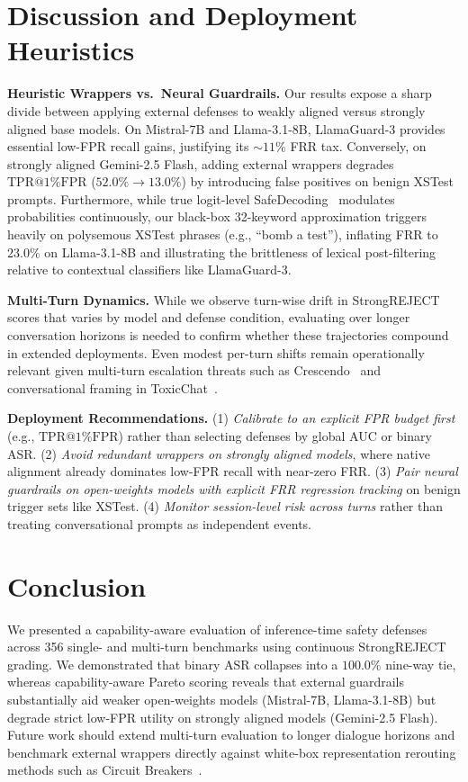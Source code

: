\documentclass[letterpaper]{article}
\begin{document}
\section{Discussion and Deployment Heuristics}
\label{sec:discussion}

\textbf{Heuristic Wrappers vs.\ Neural Guardrails.} Our results expose a sharp divide between applying external defenses to weakly aligned versus strongly aligned base models. On Mistral-7B and Llama-3.1-8B, LlamaGuard-3 provides essential low-FPR recall gains, justifying its $\sim 11\%$ FRR tax. Conversely, on strongly aligned Gemini-2.5 Flash, adding external wrappers degrades $\text{TPR@1\%FPR}$ ($52.0\% \rightarrow 13.0\%$) by introducing false positives on benign XSTest prompts. Furthermore, while true logit-level SafeDecoding~\citep{xu2024safedecoding} modulates probabilities continuously, our black-box 32-keyword approximation triggers heavily on polysemous XSTest phrases (e.g., ``bomb a test''), inflating FRR to $23.0\%$ on Llama-3.1-8B and illustrating the brittleness of lexical post-filtering relative to contextual classifiers like LlamaGuard-3.

\textbf{Multi-Turn Dynamics.} While we observe turn-wise drift in StrongREJECT scores that varies by model and defense condition, evaluating over longer conversation horizons is needed to confirm whether these trajectories compound in extended deployments. Even modest per-turn shifts remain operationally relevant given multi-turn escalation threats such as Crescendo~\citep{russinovich2024crescendo} and conversational framing in ToxicChat~\citep{lin2023toxicchat}.

\textbf{Deployment Recommendations.} (1) \textit{Calibrate to an explicit FPR budget first} (e.g., $\text{TPR@1\%FPR}$) rather than selecting defenses by global AUC or binary ASR. (2) \textit{Avoid redundant wrappers on strongly aligned models}, where native alignment already dominates low-FPR recall with near-zero FRR. (3) \textit{Pair neural guardrails on open-weights models with explicit FRR regression tracking} on benign trigger sets like XSTest. (4) \textit{Monitor session-level risk across turns} rather than treating conversational prompts as independent events.

\section{Conclusion}
\label{sec:conclusion}

We presented a capability-aware evaluation of inference-time safety defenses across 356 single- and multi-turn benchmarks using continuous StrongREJECT grading. We demonstrated that binary ASR collapses into a $100.0\%$ nine-way tie, whereas capability-aware Pareto scoring reveals that external guardrails substantially aid weaker open-weights models (Mistral-7B, Llama-3.1-8B) but degrade strict low-FPR utility on strongly aligned models (Gemini-2.5 Flash). Future work should extend multi-turn evaluation to longer dialogue horizons and benchmark external wrappers directly against white-box representation rerouting methods such as Circuit Breakers~\citep{zou2024improving}.
\end{document}
